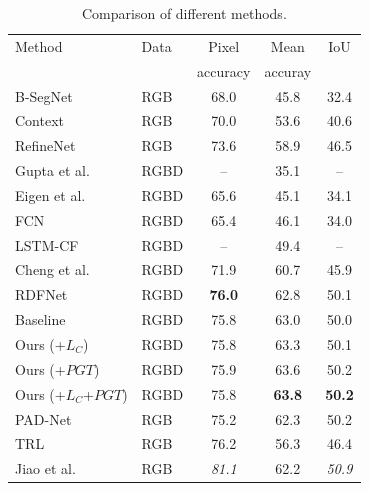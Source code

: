 



\begin{table}[tb]
	\centering
	\caption{Comparison of different methods.}
	\begin{tabular*}{8.7cm}{llccc}
		\hline
		Method & Data & Pixel & Mean  & IoU\\
		       &     & accuracy & accuray  & \\
		\hline 
		B-SegNet \cite{Kendall2015} & RGB &68.0 & 45.8 & 32.4 \\
		Context \cite{Lin2016} & RGB & 70.0 & 53.6 & 40.6 \\
		RefineNet \cite{Lin2017} & RGB & 73.6 & 58.9 & 46.5\\
		\hline
		Gupta et al. \cite{Gupta2014} & RGBD & -- & 35.1 &--\\
		Eigen et al. \cite{Eigen2015} & RGBD & 65.6 & 45.1 & 34.1\\
		FCN \cite{Long2015} & RGBD & 65.4 & 46.1 & 34.0 \\
		LSTM-CF \cite{Li2016} & RGBD & --& 49.4 & -- \\
		Cheng et al.\cite{Cheng2017} & RGBD & 71.9 & 60.7 & 45.9 \\
		RDFNet \cite{Park2017} & RGBD & \bf{76.0} & 62.8 & 50.1\\	
		Baseline &RGBD & 75.8 & 63.0 & 50.0\\
		Ours (+$L_{C}$) & RGBD & 75.8 & 63.3 & 50.1\\
		Ours (+$PGT$) & RGBD & 75.9 & 63.6 & 50.2\\
		Ours (+$L_{C}$+$PGT$)& RGBD & 75.8 & \bf{63.8} & \bf{50.2}\\
		\hline
		PAD-Net \cite{Xu2018} & RGB &75.2 & 62.3 & 50.2\\
		TRL \cite{Zhang2018} & RGB &76.2 & 56.3 & 46.4\\
		Jiao et al.\cite{Jiao2018} & RGB & \emph{81.1} & 62.2 & \emph{50.9}\\
		\hline		 		
	\end{tabular*}
	\label{Tab:Results}
\end{table}



